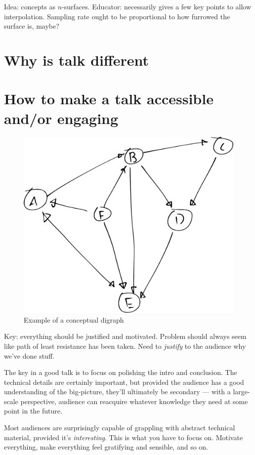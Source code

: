 \documentclass{fkpset}
\begin{document}
\begin{solution}[Response.]
  Idea: concepts as $n$-surfaces. Educator: necessarily gives a few
  key points to allow interpolation. Sampling rate ought to be
  proportional to how furrowed the surface is, maybe?

  \section{Why is talk different}

  \section{How to make a talk accessible and/or engaging}


  \begin{figure}[h]
    \centering
    \includegraphics[width=.5\linewidth,keepaspectratio]{graph.pdf}
    \caption{Example of a conceptual digraph}
  \end{figure}

  Key: everything should be justified and motivated. Problem should
  always seem like path of least resistance has been taken. Need to
  \emph{justify} to the audience why we've done stuff.

  The key in a good talk is to focus on polishing the intro and
  conclusion. The technical details are certainly important, but
  provided the audience has a good understanding of the big-picture,
  they'll ultimately be secondary --- with a large-scale perspective,
  audience can reacquire whatever knowledge they need at some point in
  the future.

  Most audiences are surprisingly capable of grappling with abstract
  technical material, provided it's \emph{interesting}. This is what
  you have to focus on. Motivate everything, make everything feel
  gratifying and sensible, and so on.


\end{solution}
\end{document}
